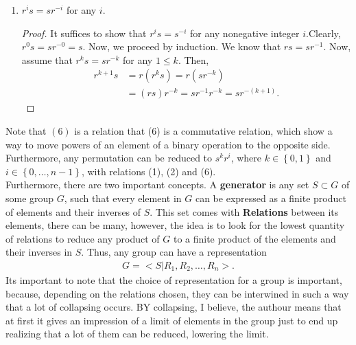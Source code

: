 \documentclass[12pt]{article}
\begin{document}
\begin{enumerate}
\begin{proof}
  Now, $r^{-1}$ brings point $1$ and $2$ to vertices $\overline{n}$ and $\overline{1}$, respectively. Then, $sr^{-1}$ moves points $1$ and $2$ to vertices $\overline{2}$ and $\overline{1}$. \\

  Thus, $rs = sr^{-1}$.
\end{proof}
\item $r^{i}s = sr^{-i}$ for any $i$.
\begin{proof}
  It suffices to show that $r^{i}s = s^{-i}$ for any nonegative integer $i$.Clearly, $r^{0}s = sr^{-0} = s$.  Now, we proceed by induction. We know that $rs = sr^{-1}$. Now, assume that $r^{k}s = sr^{-k}$ for any $1\leq k$. Then, 
\begin{align*}
  r^{k+1}s &= r(r^{k}s) = r(sr^{-k})\\
  &= (rs)r^{-k}= sr^{-1}r^{-k} = sr^{-(k+1)}.
\end{align*}
\end{proof}
\end{enumerate}

Note that $(6)$ is a relation that (6) is a commutative relation, which show a way to move powers of an element of a binary operation to the opposite side. Furthermore, any permutation can be reduced to $s^{k}r^{i}$, where $k\in\left\{ 0,1 \right\}$ and $i\in \left\{ 0,\dots,n-1 \right\}$, with relations (1), (2) and (6).\\

Furthermore, there are two important concepts. A \textbf{generator} is any set $S\subset G$ of some group $G$, such that every element in $G$ can be expressed as a finite product of elements and their inverses of $S$. This set comes with \textbf{Relations} between its elements, there can be many, however, the idea is to look for the lowest quantity of relations to reduce any product of $G$ to a finite product of the elements and their inverses in $S$. Thus, any group can have a representation 
\begin{align*}
  G= <S| R_{1},R_{2},\dots,R_{n}>.
\end{align*}
Its important to note that the choice of representation for a group is important, because, depending on the relations chosen, they can be interwined in such a way that a lot of collapsing occurs. BY collapsing, I believe, the authour means that at first it gives an impression of a limit of elements in the group just to end up realizing that a lot of them can be reduced, lowering the limit. \\
\end{document}

